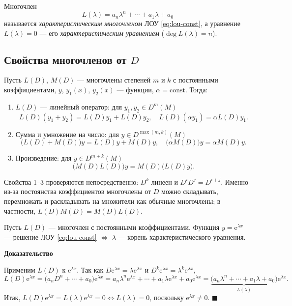 \documentclass[12pt,a4paper]{article}
\numberwithin{equation}{section}
\newcommand{\e}{\mathrm{e}}
\renewenvironment{proof}[1][Доказательство]{\begin{center}\textbf{#1}\end{center}}{\hfill$\blacksquare$\par}
\begin{document}
\begin{definitionHSE}
Многочлен
\[
L(\lambda)=a_n\lambda^n+\cdots+a_1\lambda+a_0
\]
называется \textit{характеристическим многочленом} ЛОУ \eqref{eq:lou-const}, а уравнение \(L(\lambda)=0\) --- его \textit{характеристическим уравнением} (\(\deg L(\lambda)=n\)).
\end{definitionHSE}

\subsection{Свойства многочленов от \texorpdfstring{$D$}{D}}
\label{subsec:poly-D}

Пусть \(L(D)\), \(M(D)\) --- многочлены степеней \(m\) и \(k\) с постоянными коэффициентами, \(y\), \(y_1(x)\), \(y_2(x)\) --- функции, \(\alpha=\mathrm{const}\). Тогда:

\begin{enumerate}
\item \(L(D)\) --- линейный оператор: для \(y_1,y_2\in D^m(M)\)
\[
L(D)(y_1+y_2)=L(D)y_1+L(D)y_2,\quad
L(D)(\alpha y_1)=\alpha L(D)y_1.
\]
\item Сумма и умножение на число: для \(y\in D^{\max(m,k)}(M)\)
\[
\bigl(L(D)+M(D)\bigr)y=L(D)y+M(D)y,\quad
\bigl(\alpha M(D)\bigr)y=\alpha M(D)y.
\]
\item Произведение: для \(y\in D^{m+k}(M)\)
\[
\bigl(M(D)L(D)\bigr)y=M(D)\bigl(L(D)y\bigr).
\]
\end{enumerate}

Свойства 1--3 проверяются непосредственно: \(D^k\) линеен и \(D^iD^j=D^{i+j}\). Именно из-за постоянства коэффициентов многочлены от \(D\) можно складывать, перемножать и раскладывать на множители как обычные многочлены; в частности, \(L(D)M(D)=M(D)L(D)\).

\begin{theoremHSE}
Пусть \(L(D)\) --- многочлен с постоянными коэффициентами. Функция \(y=\e^{\lambda x}\) --- решение ЛОУ \eqref{eq:lou-const} \(\iff\) \(\lambda\) --- корень характеристического уравнения.
\end{theoremHSE}

\begin{proof}
Применим \(L(D)\) к \(\e^{\lambda x}\). Так как \(D\e^{\lambda x}=\lambda\e^{\lambda x}\) и \(D^k\e^{\lambda x}=\lambda^k\e^{\lambda x}\),
\[
L(D)\e^{\lambda x}=\bigl(a_nD^n+\cdots+a_0\bigr)\e^{\lambda x}
=a_n\lambda^n\e^{\lambda x}+\cdots+a_1\lambda\e^{\lambda x}+a_0\e^{\lambda x}
=\underbrace{\bigl(a_n\lambda^n+\cdots+a_1\lambda+a_0\bigr)}_{L(\lambda)}\e^{\lambda x}.
\]
Итак, \(L(D)\e^{\lambda x}=L(\lambda)\e^{\lambda x}=0\iff L(\lambda)=0\), поскольку \(\e^{\lambda x}\neq0\).
\end{proof}
\end{document}
